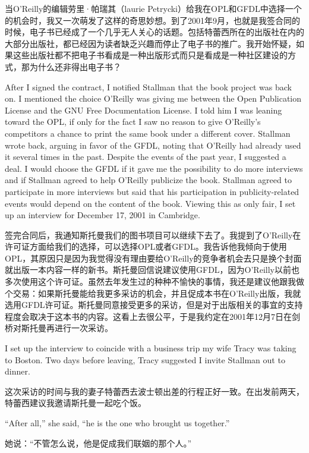 \ifdefined\chs
当O'Reilly的编辑劳里·帕瑞其（laurie Petrycki）给我在OPL和GFDL中选择一个的机会时，我又一次萌发了这样的奇思妙想。到了2001年9月，也就是我签合同的时候，电子书已经成了一个几乎无人关心的话题。包括特蕾西所在的出版社在内的大部分出版社，都已经因为读者缺乏兴趣而停止了电子书的推广。我开始怀疑，如果这些出版社都不把电子书看成是一种出版形式而只是看成是一种社区建设的方式，那为什么还非得出电子书？
\fi

\ifdefined\eng
After I signed the contract, I notified Stallman that the book project was back on. I mentioned the choice O'Reilly was giving me between the Open Publication License and the GNU Free Documentation License. I told him I was leaning toward the OPL, if only for the fact I saw no reason to give O'Reilly's competitors a chance to print the same book under a different cover. Stallman wrote back, arguing in favor of the GFDL, noting that O'Reilly had already used it several times in the past. Despite the events of the past year, I suggested a deal. I would choose the GFDL if it gave me the possibility to do more interviews and if Stallman agreed to help O'Reilly publicize the book. Stallman agreed to participate in more interviews but said that his participation in publicity-related events would depend on the content of the book. Viewing this as only fair, I set up an interview for December 17, 2001 in Cambridge.
\fi

\ifdefined\chs
签完合同后，我通知斯托曼我们的图书项目可以继续下去了。我提到了O'Reilly在许可证方面给我们的选择，可以选择OPL或者GFDL。我告诉他我倾向于使用OPL，其原因只是因为我觉得没有理由要给O'Reilly的竞争者机会去只是换个封面就出版一本内容一样的新书。斯托曼回信说建议使用GFDL，因为O'Reilly以前也多次使用这个许可证。虽然去年发生过的种种不愉快的事情，我还是建议他跟我做个交易：如果斯托曼能给我更多采访的机会，并且促成本书在O'Reilly出版，我就选用GFDL许可证。斯托曼同意接受更多的采访，但是对于出版相关的事宜的支持程度会取决于这本书的内容。这看上去很公平，于是我约定在2001年12月7日在剑桥对斯托曼再进行一次采访。
\fi

\ifdefined\eng
I set up the interview to coincide with a business trip my wife Tracy was taking to Boston. Two days before leaving, Tracy suggested I invite Stallman out to dinner.
\fi

\ifdefined\chs
这次采访的时间与我的妻子特蕾西去波士顿出差的行程正好一致。在出发前两天，特蕾西建议我邀请斯托曼一起吃个饭。
\fi

\ifdefined\eng
``After all,'' she said, ``he is the one who brought us together.''
\fi

\ifdefined\chs
她说：``不管怎么说，他是促成我们联姻的那个人。''
\fi

